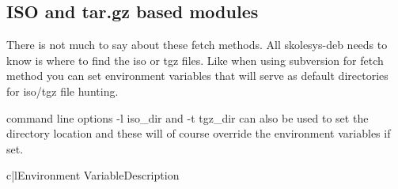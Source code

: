 
\subsection{ISO and tar.gz based modules\label{skolesys-deb-iso}}
There is not much to say about these fetch methods. All skolesys-deb needs to know is where to find the iso or tgz files. Like when using subversion for fetch method you can set environment variables that will serve as default directories for iso/tgz file hunting.

command line options -l iso_dir and -t  tgz_dir can also be used to set the directory location and these will of course override the environment variables if set. 

\begin{tableii}{c|l}{}{Environment Variable}{Description}
\end{tableii}
